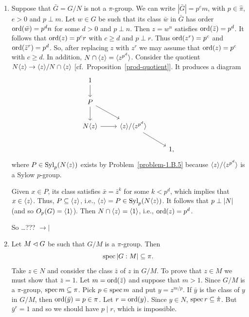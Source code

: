 \begin{solution}
\begin{enumerate}[\upshape a)]
\begin{enumerate}[$\to\!\!|$]
        From
        \begin{align*}
            |N\gen z^x| &=|Nx^{-1}\gen z|\\
                &=\abs N\abs{\gen z}/\abs{N\cap\gen z} &&\textrm{; Prob.~\ref{HwK}}\\
                &=\abs N\abs{\gen z}/|\gen z^p| &&\textrm{; }N\cap\gen z=\gen{z^p}\\
                &=\abs Np,
        \end{align*}
        we deduce that $N\gen z^x$ is a $\hat\pi$-group. Therefore, the core $\Core_G(N\gen z)$ is a normal $\hat\pi$-group. It follows that $\Core_G(N\gen z)\subseteq N$, i.e.,
        $$
            \Core_G(N\gen z)=N.
        $$
        So \dots??? $\to\!\!|$

        \item Suppose that $\bar G=G/N$ is not a $\pi$-group. We can write $|\bar G|=p^em$, with $p\in\hat\pi$, $e>0$ and $p\perp m$. Let $w\in G$ be such that its class $\bar w$ in $\bar G$ has order ${\rm ord}(\bar w)=p^dn$ for some $d>0$ and $p\perp n$. Then $z=w^n$ satisfies ${\rm ord}(\bar z)=p^d$. It follows that ${\rm ord}(z)=p^cr$ with $c\ge d$ and $p\perp r$. Thus ${\rm ord}(z^r)=p^c$ and ${\rm ord}(\bar z^r)=p^d$. So, after replacing $z$ with $z^r$ we may assume that ${\rm ord}(z)=p^c$ with $c\ge d$. In addition, $N\cap\langle z\rangle=\langle z^{p^d}\rangle$. Consider the quotient $N\langle z\rangle\to\langle z\rangle/N\cap\langle z\rangle$ [cf.~Proposition~\ref{prod-quotient}]. It produces a diagram
        $$
            \begin{tikzcd}
                1\arrow[d]\\
                P\arrow[rd]\arrow[d]\\
                N\gen z\arrow[r]&\gen z/\gen{z^{p^d}}\arrow[rd]\\
                &&1,
            \end{tikzcd}
        $$
        where $P\in{\rm Syl}_p(N\langle z\rangle)$ exists by Problem~\ref{problem-1.B.5} because $\langle z\rangle/\langle z^{p^d}\rangle$ is a Sylow $p$-group.
        
        Given $x\in P$, its class satisfies $\bar x=\bar z^k$ for some $k<p^d$, which implies that $x\in\langle z\rangle$. Thus, $P\subseteq\langle z\rangle$, i.e., $\langle z\rangle=P\in{\rm Syl}_p(N\langle z\rangle)$. It follows that $p\perp\left\vert{N}\right\vert$ (and so $O_p(G)=\langle1\rangle$). Then $N\cap\langle z\rangle=\langle1\rangle$, i.e., ${\rm ord}(z)=p^d$.
        
        
        So \dots??? $\to\!\!|$
        
        \item[\checkmark] Let $M\lhd G$ be such that $G/M$ is a $\pi$-group. Then
        $$
            \operatorname{spec}\left\vert{G:M}\right\vert\subseteq\pi.
        $$
        Take $z\in N$ and consider the class $\bar z$ of $z$ in $G/M$. To prove that $z\in M$ we must show that $\bar z=1$. Let $m={\rm ord}(\bar z)$ and suppose that $m>1$. Since $G/M$ is a $\pi$-group, $\operatorname{spec}m\subseteq\pi$. Pick $p\in\operatorname{spec}m$ and put $y=z^{m/p}$. If $\bar y$ is the class of $y$ in $G/M$, then ${\rm ord}(\bar y) = p\in\pi$. Let $r={\rm ord}(y)$. Since $y\in N$, $\operatorname{spec}r\subseteq\hat\pi$. But $\bar y^r=1$ and so we should have $p\mid r$, which is impossible.
        

\end{enumerate}
\end{enumerate}
\end{solution}
